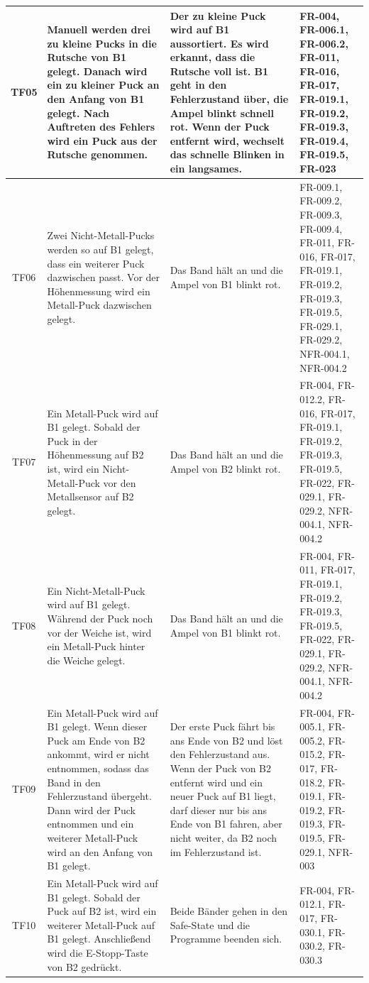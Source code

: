 \documentclass[oneside,a4paper,titlepage]{scrartcl}              %
\begin{document}
\begin{small}
\begin{center}
\begin{longtable}{|c|p{4cm}|p{6cm}|C{3cm}|}
      \hline
      TF05 & Manuell werden drei zu kleine Pucks in die Rutsche von B1 gelegt. Danach wird ein zu kleiner Puck an den Anfang von B1 gelegt. Nach Auftreten des Fehlers wird ein Puck aus der Rutsche genommen. & Der zu kleine Puck wird auf B1 aussortiert. Es wird erkannt, dass die Rutsche voll ist. B1 geht in den Fehlerzustand über, die Ampel blinkt schnell rot. Wenn der Puck entfernt wird, wechselt das schnelle Blinken in ein langsames. & FR-004, FR-006.1, FR-006.2, FR-011, FR-016, FR-017, FR-019.1, FR-019.2, FR-019.3, FR-019.4, FR-019.5, FR-023\\
      \hline
       TF06 & Zwei Nicht-Metall-Pucks werden so auf B1 gelegt, dass ein weiterer Puck dazwischen passt. Vor der Höhenmessung wird ein Metall-Puck dazwischen gelegt. & Das Band hält an und die Ampel von B1 blinkt rot. & FR-009.1, FR-009.2, FR-009.3, FR-009.4, FR-011, FR-016, FR-017, FR-019.1, FR-019.2, FR-019.3, FR-019.5, FR-029.1, FR-029.2, NFR-004.1, NFR-004.2\\
      \hline
      TF07 & Ein Metall-Puck wird auf B1 gelegt. Sobald der Puck in der Höhenmessung auf B2 ist, wird ein Nicht-Metall-Puck vor den Metallsensor auf B2 gelegt. & Das Band hält an und die Ampel von B2 blinkt rot. & FR-004, FR-012.2, FR-016, FR-017, FR-019.1, FR-019.2, FR-019.3, FR-019.5, FR-022, FR-029.1, FR-029.2, NFR-004.1, NFR-004.2\\
      \hline
       TF08 & Ein Nicht-Metall-Puck wird auf B1 gelegt. Während der Puck noch vor der Weiche ist, wird ein Metall-Puck hinter die Weiche gelegt. & Das Band hält an und die Ampel von B1 blinkt rot. & FR-004, FR-011, FR-017, FR-019.1, FR-019.2, FR-019.3, FR-019.5, FR-022, FR-029.1, FR-029.2, NFR-004.1, NFR-004.2\\
      \hline
      TF09 & Ein Metall-Puck wird auf B1 gelegt. Wenn dieser Puck am Ende von B2 ankommt, wird er nicht entnommen, sodass das Band in den Fehlerzustand übergeht. Dann wird der Puck entnommen und ein weiterer Metall-Puck wird an den Anfang von B1 gelegt. & Der erste Puck fährt bis ans Ende von B2 und löst den Fehlerzustand aus. Wenn der Puck von B2 entfernt wird und ein neuer Puck auf B1 liegt, darf dieser nur bis ans Ende von B1 fahren, aber nicht weiter, da B2 noch im Fehlerzustand ist. & FR-004, FR-005.1, FR-005.2, FR-015.2, FR-017, FR-018.2, FR-019.1, FR-019.2, FR-019.3, FR-019.5, FR-029.1, NFR-003\\
      \hline
       TF10 & Ein Metall-Puck wird auf B1 gelegt. Sobald der Puck auf B2 ist, wird ein weiterer Metall-Puck auf B1 gelegt. Anschließend wird die E-Stopp-Taste von B2 gedrückt. & Beide Bänder gehen in den Safe-State und die Programme beenden sich. & FR-004, FR-012.1, FR-017, FR-030.1, FR-030.2, FR-030.3\\

\end{longtable}
\end{center}
\end{small}
\end{document}
